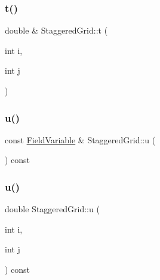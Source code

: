 \mbox{\label{classStaggeredGrid_a30c69c5b8e2803a1e4d876f3942cecb1}} 
\subsubsection{\texorpdfstring{t()}{t()}\hspace{0.1cm}{\footnotesize\ttfamily [3/3]}}
{\footnotesize\ttfamily double \& Staggered\+Grid\+::t (\begin{DoxyParamCaption}\item[{int}]{i,  }\item[{int}]{j }\end{DoxyParamCaption})}

\mbox{\label{classStaggeredGrid_a87cee12621c641ab143a8b1a61b2ef7e}} 
\subsubsection{\texorpdfstring{u()}{u()}\hspace{0.1cm}{\footnotesize\ttfamily [1/3]}}
{\footnotesize\ttfamily const \mbox{\hyperlink{classFieldVariable}{Field\+Variable}} \& Staggered\+Grid\+::u (\begin{DoxyParamCaption}{ }\end{DoxyParamCaption}) const}

\mbox{\label{classStaggeredGrid_a0324ce4d1fe2343d8aa9514e460cc556}} 
\subsubsection{\texorpdfstring{u()}{u()}\hspace{0.1cm}{\footnotesize\ttfamily [2/3]}}
{\footnotesize\ttfamily double Staggered\+Grid\+::u (\begin{DoxyParamCaption}\item[{int}]{i,  }\item[{int}]{j }\end{DoxyParamCaption}) const}

\mbox{\label{classStaggeredGrid_a0ed62d6752b6b2b3ead5f654b515cd12}} 
